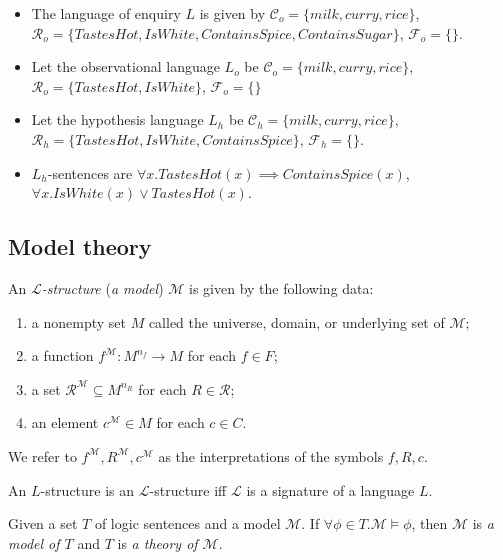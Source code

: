 \begin{exmp}
\begin{itemize}
\item The language of enquiry $L$ is given by $\mathcal{C}_o=\{milk, curry, rice\}$,$\mathcal{R}_o=\{TastesHot, IsWhite, ContainsSpice, ContainsSugar\}$, $\mathcal{F}_o=\{\}$.
\item Let the observational language $L_o$ be $\mathcal{C}_o=\{milk, curry, rice\}$,\\ $\mathcal{R}_o=\{TastesHot, IsWhite\}$, $\mathcal{F}_o=\{\}$
\item Let the hypothesis language $L_h$ be $\mathcal{C}_h=\{milk, curry, rice\}$,\\ $\mathcal{R}_h=\{TastesHot, IsWhite, ContainsSpice\}$, $\mathcal{F}_h=\{\}$.
\item $L_h$-sentences are $\forall x. TastesHot(x) \implies ContainsSpice(x)$,\\ $\forall x. IsWhite(x) \lor TastesHot(x)$.
\end{itemize}
\end{exmp}

\subsection{Model theory\cite{marker2002}}

\begin{defn}
An \emph{$\mathcal{L}$-structure} (\emph{a model}) $\mathcal{M}$ is given by the following data:
\begin{enumerate}
\item a nonempty set $M$ called the universe, domain, or underlying set of $\mathcal{M}$;
\item a function $f^{\mathcal{M}} : M^{n_f} \to M$ for each $f \in F$;
\item a set $\mathcal{R}^{\mathcal{M}} \subseteq M^{n_R}$ for each $R \in \mathcal{R}$;
\item an element $c^\mathcal{M} \in M$ for each $c \in C$.
\end{enumerate}
We refer to $f^\mathcal{M}, R^\mathcal{M}, c^\mathcal{M}$ as the interpretations of the symbols $f ,R, c$.
\end{defn}

\begin{remark}
An $L$-structure is an $\mathcal{L}$-structure iff $\mathcal{L}$ is a signature of a language $L$.
\end{remark}

\begin{defn}
Given a set $T$ of logic sentences and a model $\mathcal{M}$. If $\forall \phi \in T. \mathcal{M} \models \phi$, then $\mathcal{M}$ is \emph{a model of $T$} and $T$ is \emph{a theory of $\mathcal{M}$}.
\end{defn}

